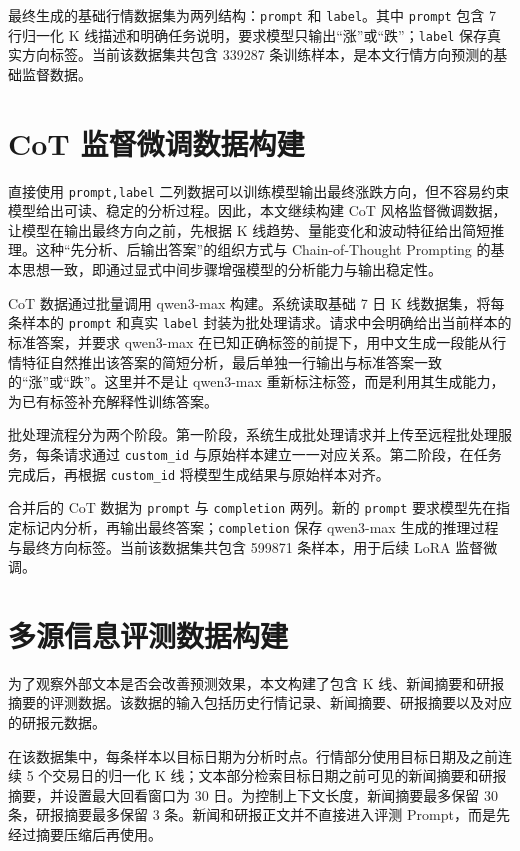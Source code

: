 最终生成的基础行情数据集为两列结构：\texttt{prompt} 和 \texttt{label}。其中 \texttt{prompt} 包含 7 行归一化 K 线描述和明确任务说明，要求模型只输出“涨”或“跌”；\texttt{label} 保存真实方向标签。当前该数据集共包含 339287 条训练样本，是本文行情方向预测的基础监督数据。

\section{CoT 监督微调数据构建}

直接使用 \texttt{prompt,label} 二列数据可以训练模型输出最终涨跌方向，但不容易约束模型给出可读、稳定的分析过程。因此，本文继续构建 CoT 风格监督微调数据，让模型在输出最终方向之前，先根据 K 线趋势、量能变化和波动特征给出简短推理。这种“先分析、后输出答案”的组织方式与 Chain-of-Thought Prompting 的基本思想一致，即通过显式中间步骤增强模型的分析能力与输出稳定性\cite{wei2022cot}。

CoT 数据通过批量调用 qwen3-max 构建。系统读取基础 7 日 K 线数据集，将每条样本的 \texttt{prompt} 和真实 \texttt{label} 封装为批处理请求。请求中会明确给出当前样本的标准答案，并要求 qwen3-max 在已知正确标签的前提下，用中文生成一段能从行情特征自然推出该答案的简短分析，最后单独一行输出与标准答案一致的“涨”或“跌”。这里并不是让 qwen3-max 重新标注标签，而是利用其生成能力，为已有标签补充解释性训练答案。

批处理流程分为两个阶段。第一阶段，系统生成批处理请求并上传至远程批处理服务，每条请求通过 \texttt{custom\_id} 与原始样本建立一一对应关系。第二阶段，在任务完成后，再根据 \texttt{custom\_id} 将模型生成结果与原始样本对齐。

合并后的 CoT 数据为 \texttt{prompt} 与 \texttt{completion} 两列。新的 \texttt{prompt} 要求模型先在指定标记内分析，再输出最终答案；\texttt{completion} 保存 qwen3-max 生成的推理过程与最终方向标签。当前该数据集共包含 599871 条样本，用于后续 LoRA 监督微调。

\section{多源信息评测数据构建}

为了观察外部文本是否会改善预测效果，本文构建了包含 K 线、新闻摘要和研报摘要的评测数据。该数据的输入包括历史行情记录、新闻摘要、研报摘要以及对应的研报元数据。

在该数据集中，每条样本以目标日期为分析时点。行情部分使用目标日期及之前连续 5 个交易日的归一化 K 线；文本部分检索目标日期之前可见的新闻摘要和研报摘要，并设置最大回看窗口为 30 日。为控制上下文长度，新闻摘要最多保留 30 条，研报摘要最多保留 3 条。新闻和研报正文并不直接进入评测 Prompt，而是先经过摘要压缩后再使用。


